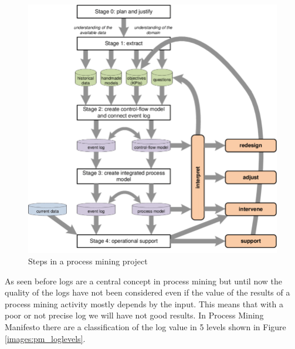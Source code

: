 \begin{figure}[!ht]
    \centering
\includegraphics[width=\textwidth]{images/pm_project.png}
    \caption{Steps in a process mining project \cite{DBLP:conf/bpm/ProcessMiningManifesto}}
    \label{images:pm_project}
\end{figure}

As seen before logs are a central concept in process mining but until now the quality of the logs have not been considered 
even if the value of the results of a process mining activity mostly depends by the input. This means that with a poor or not 
precise log we will have not good results.
In Process Mining Manifesto there are a classification of the log value in 5 levels shown in Figure \ref{images:pm_loglevels}.

